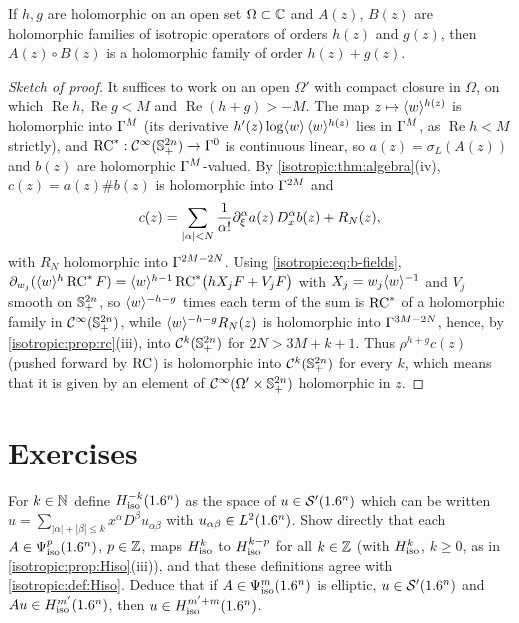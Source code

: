 \begin{proposition}\label{isotropic:prop:holomorphic}
If $h,g$ are holomorphic on an open set $\Omega\subset\mathbb{C}$ and $A(z)$, $B(z)$ are
holomorphic families of isotropic operators of orders $h(z)$ and $g(z)$, then
$A(z)\circ B(z)$ is a holomorphic family of order $h(z)+g(z)$.
\end{proposition}
\begin{proof}[Sketch of proof]
It suffices to work on an open $\Omega'$ with compact closure in $\Omega$, on
which $\operatorname{Re}h,\operatorname{Re}g<M$ and $\operatorname{Re}(h+g)>-M$. The map
$z\mapsto\langle w\rangle^{h(z)}$ is holomorphic into $\Gamma^{M}$ (its derivative
$h'(z)\log\langle w\rangle\,\langle w\rangle^{h(z)}$ lies in $\Gamma^{M}$, as $\operatorname{Re}h<M$
strictly), and $\operatorname{RC}^*:\mathcal{C}^\infty(\mathbb{S}^{2n}_{+})\to\Gamma^{0}$ is continuous linear, so
$a(z)=\sigma_L(A(z))$ and $b(z)$ are holomorphic $\Gamma^{M}$-valued. By
\cref{isotropic:thm:algebra}(iv), $c(z)=a(z)\#b(z)$ is holomorphic into
$\Gamma^{2M}$ and
\begin{equation*}
  c(z)=\sum_{|\alpha|<N}\frac1{\alpha!}\partial_\xi^\alpha a(z)\,D_x^\alpha b(z)+R_N(z),
\end{equation*}
with $R_N$ holomorphic into $\Gamma^{2M-2N}$. Using \eqref{isotropic:eq:b-fields},
$\partial_{w_j}(\langle w\rangle^h\operatorname{RC}^*F)=\langle w\rangle^{h-1}\operatorname{RC}^*\bigl(hX_jF+V_jF\bigr)$ with
$X_j=w_j\langle w\rangle^{-1}$ and $V_j$ smooth on $\mathbb{S}^{2n}_{+}$, so
$\langle w\rangle^{-h-g}$ times each term of the sum is $\operatorname{RC}^*$ of a holomorphic family
in $\mathcal{C}^\infty(\mathbb{S}^{2n}_{+})$, while $\langle w\rangle^{-h-g}R_N(z)$ is holomorphic into
$\Gamma^{3M-2N}$, hence, by \cref{isotropic:prop:rc}(iii), into
$\mathcal C^{k}(\mathbb{S}^{2n}_{+})$ for $2N>3M+k+1$. Thus $\rho^{h+g}c(z)$ (pushed forward
by $\operatorname{RC}$) is holomorphic into $\mathcal C^k(\mathbb{S}^{2n}_{+})$ for every $k$, which
means that it is given by an element of $\mathcal{C}^\infty(\Omega'\times\mathbb{S}^{2n}_{+})$
holomorphic in $z$.
\end{proof}

\section{Exercises}\label{isotropic:sec:exercises}

\begin{exercise}\label{isotropic:ex:sobolev-integer}
For $k\in\mathbb{N}$ define $H^{-k}_{\mathrm{iso}}(1.6^n)$ as the space of $u\in\mathcal{S}'(1.6^n)$ which can
be written $u=\sum_{|\alpha|+|\beta|\le k}x^\alpha D^\beta u_{\alpha\beta}$ with
$u_{\alpha\beta}\in L^2(1.6^n)$. Show directly that each $A\in\Psi^{p}_{\mathrm{iso}}(1.6^n)$,
$p\in\mathbb{Z}$, maps $H^{k}_{\mathrm{iso}}$ to $H^{k-p}_{\mathrm{iso}}$ for all $k\in\mathbb{Z}$ (with $H^{k}_{\mathrm{iso}}$,
$k\ge0$, as in \cref{isotropic:prop:Hiso}(iii)), and that these definitions
agree with \cref{isotropic:def:Hiso}. Deduce that if $A\in\Psi^{m}_{\mathrm{iso}}(1.6^n)$ is
elliptic, $u\in\mathcal{S}'(1.6^n)$ and $Au\in H^{m'}_{\mathrm{iso}}(1.6^n)$, then
$u\in H^{m'+m}_{\mathrm{iso}}(1.6^n)$.
\end{exercise}

